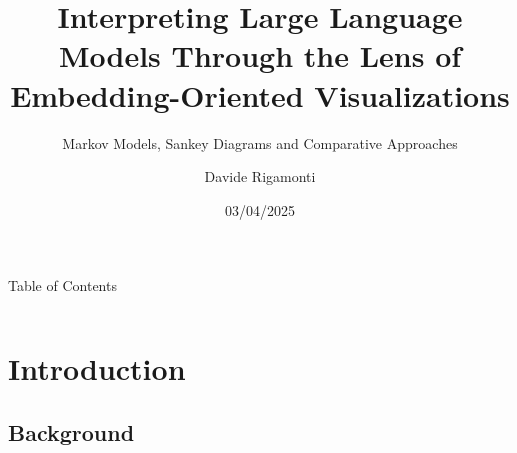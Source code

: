 \documentclass[aspectratio=169, 12pt, compress]{beamer}
\title{Interpreting Large Language Models Through the Lens of Embedding-Oriented Visualizations}
\subtitle{Markov Models, Sankey Diagrams and Comparative Approaches}
\author{Davide Rigamonti}
\date{03/04/2025}
\begin{document}
    \begin{frame}
        \maketitle
    \end{frame}
    
    \begin{frame}{Table of Contents}
        \setcounter{tocdepth}{2}
        \vspace{0.2cm}
        \begin{columns}[onlytextwidth,T]
            \hfill%
            \begin{column}{.35\textwidth}%
                \tableofcontents[sections=1-3]%
            \end{column}%
            \hfill%
            \begin{column}{.35\textwidth}%
                \tableofcontents[sections=4-6]%
            \end{column}%
            \hfill%
        \end{columns}
    \end{frame}
    
    \section{Introduction}

    \subsection{Background}
\end{document}
